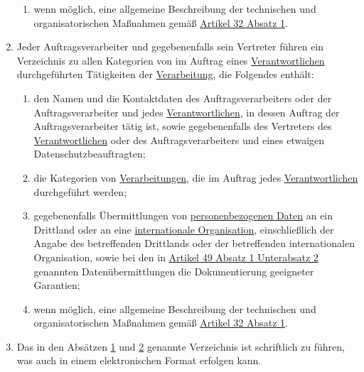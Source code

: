 \begin{enumerate}
\begin{enumerate}
    \item wenn möglich, eine allgemeine Beschreibung der technischen und organisatorischen Maßnahmen gemäß
     \hyperref[itm:32-1]{Artikel 32 Absatz 1}.
    \label{itm:30-1g}

  \end{enumerate}

  \item Jeder Auftragsverarbeiter und gegebenenfalls sein Vertreter führen ein Verzeichnis zu allen Kategorien von im
   Auftrag eines \hyperref[itm:04-7]{Verantwortlichen} durchgeführten Tätigkeiten der \hyperref[itm:04-2]{Verarbeitung}, die Folgendes enthält:
  \label{itm:30-2}

  \begin{enumerate}
  
    \item den Namen und die Kontaktdaten des Auftragsverarbeiters oder der Auftragsverarbeiter und jedes
     \hyperref[itm:04-7]{Verantwortlichen}, in dessen Auftrag der Auftragsverarbeiter tätig ist, sowie gegebenenfalls des Vertreters des
     \hyperref[itm:04-7]{Verantwortlichen} oder des Auftragsverarbeiters und eines etwaigen Datenschutzbeauftragten;
    \label{itm:30-2a}

    \item die Kategorien von \hyperref[itm:04-2]{Verarbeitungen}, die im Auftrag jedes \hyperref[itm:04-7]{Verantwortlichen} durchgeführt werden;
    \label{itm:30-2b}

    \item gegebenenfalls Übermittlungen von \hyperref[itm:04-1]{personenbezogenen Daten} an ein Drittland oder an eine \hyperref[itm:04-29]{internationale
     Organisation}, einschließlich der Angabe des betreffenden Drittlands oder der betreffenden internationalen
     Organisation, sowie bei den in \hyperref[itm:49-1-2]{Artikel 49 Absatz 1 Unterabsatz 2} genannten
     Datenübermittlungen die Dokumentierung geeigneter Garantien;
    \label{itm:30-2c}

    \item wenn möglich, eine allgemeine Beschreibung der technischen und organisatorischen Maßnahmen gemäß \hyperref
     [itm:32-1]{Artikel 32 Absatz 1}.
    \label{itm:30-2d}

  \end{enumerate}

  \item Das in den Absätzen \hyperref[itm:30-1]{1} und \hyperref[itm:30-2]{2} genannte Verzeichnis ist schriftlich zu
   führen, was auch in einem elektronischen Format erfolgen kann.
  \label{itm:30-3}


\end{enumerate}
